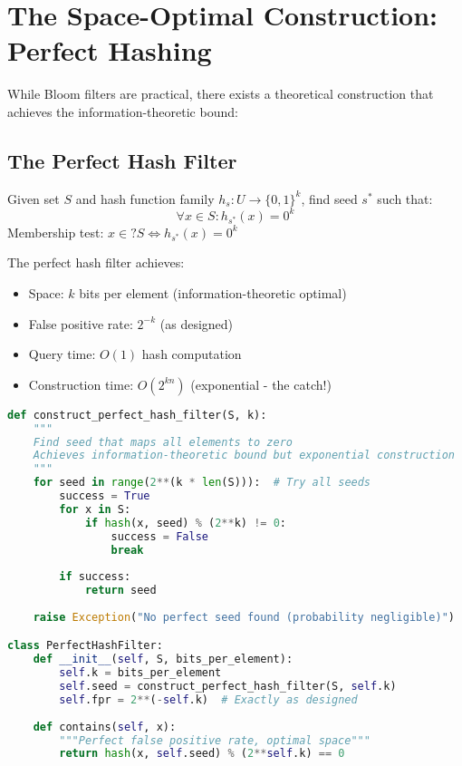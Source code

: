 \section{The Space-Optimal Construction: Perfect Hashing}

While Bloom filters are practical, there exists a theoretical construction that achieves the information-theoretic bound:

\subsection{The Perfect Hash Filter}

\begin{definition}
Given set $S$ and hash function family $h_s: U \to \{0,1\}^k$, find seed $s^*$ such that:
\begin{equation}
\forall x \in S: h_{s^*}(x) = 0^k
\end{equation}
Membership test: $x \in? S \Leftrightarrow h_{s^*}(x) = 0^k$
\end{definition}

\begin{theorem}
The perfect hash filter achieves:
\begin{itemize}
\item Space: $k$ bits per element (information-theoretic optimal)
\item False positive rate: $2^{-k}$ (as designed)
\item Query time: $O(1)$ hash computation
\item Construction time: $O(2^{kn})$ (exponential - the catch!)
\end{itemize}
\end{theorem}

\begin{lstlisting}[language=Python, caption={Perfect hash filter (theoretical construction)}]
def construct_perfect_hash_filter(S, k):
    """
    Find seed that maps all elements to zero
    Achieves information-theoretic bound but exponential construction
    """
    for seed in range(2**(k * len(S))):  # Try all seeds
        success = True
        for x in S:
            if hash(x, seed) % (2**k) != 0:
                success = False
                break
        
        if success:
            return seed
    
    raise Exception("No perfect seed found (probability negligible)")

class PerfectHashFilter:
    def __init__(self, S, bits_per_element):
        self.k = bits_per_element
        self.seed = construct_perfect_hash_filter(S, self.k)
        self.fpr = 2**(-self.k)  # Exactly as designed
    
    def contains(self, x):
        """Perfect false positive rate, optimal space"""
        return hash(x, self.seed) % (2**self.k) == 0
\end{lstlisting}

